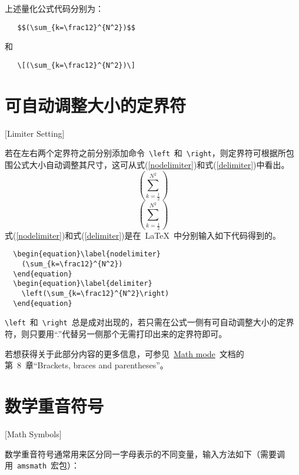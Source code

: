 上述量化公式代码分别为：
\begin{lstlisting}
   $$(\sum_{k=\frac12}^{N^2})$$
 \end{lstlisting}
和
\begin{lstlisting}
   \[(\sum_{k=\frac12}^{N^2})\]
 \end{lstlisting}

\section{可自动调整大小的定界符}[Limiter Setting]

若在左右两个定界符之前分别添加命令~\verb|\left|~和~\verb|\right|，则定界符可根据所包围公式大小自动调整其尺寸，这可从式(\ref{nodelimiter})和式(\ref{delimiter})中看出。
\begin{equation}\label{nodelimiter}
  (\sum_{k=\frac12}^{N^2})
\end{equation}
\begin{equation}\label{delimiter}
  \left(\sum_{k=\frac12}^{N^2}\right)
\end{equation}
式(\ref{nodelimiter})和式(\ref{delimiter})是在~\LaTeX~中分别输入如下代码得到的。
\begin{lstlisting}
  \begin{equation}\label{nodelimiter}
    (\sum_{k=\frac12}^{N^2})
  \end{equation}
  \begin{equation}\label{delimiter}
    \left(\sum_{k=\frac12}^{N^2}\right)
  \end{equation}
\end{lstlisting}

\verb|\left|~和~\verb|\right|~总是成对出现的，若只需在公式一侧有可自动调整大小的定界符，则只要用“.”代替另一侧那个无需打印出来的定界符即可。

若想获得关于此部分内容的更多信息，可参见~\href{http://tug.ctan.org/cgi-bin/ctanPackageInformation.py?id=voss-mathmode}{Math mode}~文档的第~8~章“Brackets, braces and parentheses”。

\section{数学重音符号}[Math Symbols]

数学重音符号通常用来区分同一字母表示的不同变量，输入方法如下（需要调用~\verb|amsmath|~宏包）：

